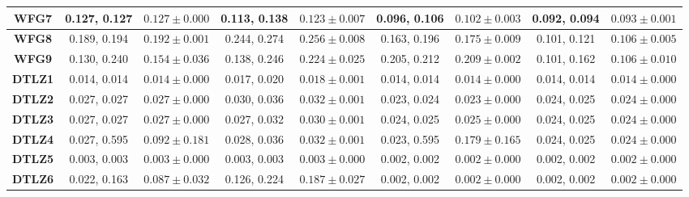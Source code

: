 \begin{table*}[t]
{\begin{tabular}{c|c|c|c|c|c|c|c|c|}
\multicolumn{1}{|c|}{\textbf{WFG7}}  & 0.127, 0.127            & $0.127 \pm 0.000$       & 0.113, 0.138            & $0.123 \pm 0.007$       & 0.096, 0.106            & $0.102 \pm 0.003$       & 0.092, 0.094            & $0.093 \pm 0.001$       \\ \hline
\multicolumn{1}{|c|}{\textbf{WFG8}}  & 0.189, 0.194            & $0.192 \pm 0.001$       & 0.244, 0.274            & $0.256 \pm 0.008$       & 0.163, 0.196            & $0.175 \pm 0.009$       & 0.101, 0.121            & $0.106 \pm 0.005$       \\ \hline
\multicolumn{1}{|c|}{\textbf{WFG9}}  & 0.130, 0.240            & $0.154 \pm 0.036$       & 0.138, 0.246            & $0.224 \pm 0.025$       & 0.205, 0.212            & $0.209 \pm 0.002$       & 0.101, 0.162            & $0.106 \pm 0.010$       \\ \hline
\multicolumn{1}{|c|}{\textbf{DTLZ1}} & 0.014, 0.014            & $0.014 \pm 0.000$       & 0.017, 0.020            & $0.018 \pm 0.001$       & 0.014, 0.014            & $0.014 \pm 0.000$       & 0.014, 0.014            & $0.014 \pm 0.000$       \\ \hline
\multicolumn{1}{|c|}{\textbf{DTLZ2}} & 0.027, 0.027            & $0.027 \pm 0.000$       & 0.030, 0.036            & $0.032 \pm 0.001$       & 0.023, 0.024            & $0.023 \pm 0.000$       & 0.024, 0.025            & $0.024 \pm 0.000$       \\ \hline
\multicolumn{1}{|c|}{\textbf{DTLZ3}} & 0.027, 0.027            & $0.027 \pm 0.000$       & 0.027, 0.032            & $0.030 \pm 0.001$       & 0.024, 0.025            & $0.025 \pm 0.000$       & 0.024, 0.025            & $0.024 \pm 0.000$       \\ \hline
\multicolumn{1}{|c|}{\textbf{DTLZ4}} & 0.027, 0.595            & $0.092 \pm 0.181$       & 0.028, 0.036            & $0.032 \pm 0.001$       & 0.023, 0.595            & $0.179 \pm 0.165$       & 0.024, 0.025            & $0.024 \pm 0.000$       \\ \hline
\multicolumn{1}{|c|}{\textbf{DTLZ5}} & 0.003, 0.003            & $0.003 \pm 0.000$       & 0.003, 0.003            & $0.003 \pm 0.000$       & 0.002, 0.002            & $0.002 \pm 0.000$       & 0.002, 0.002            & $0.002 \pm 0.000$       \\ \hline
\multicolumn{1}{|c|}{\textbf{DTLZ6}} & 0.022, 0.163            & $0.087 \pm 0.032$       & 0.126, 0.224            & $0.187 \pm 0.027$       & 0.002, 0.002            & $0.002 \pm 0.000$       & 0.002, 0.002            & $0.002 \pm 0.000$       \\ \hline

\end{tabular}}
\end{table*}
